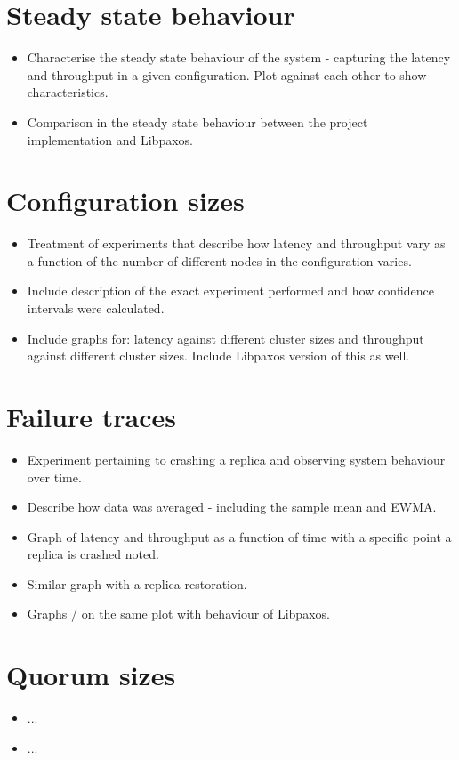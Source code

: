 \documentclass[12pt,twoside,notitlepage]{report}
\begin{document}
\section{Steady state behaviour}
\begin{itemize}
   \item Characterise the steady state behaviour of the system - capturing the latency and throughput in a given configuration. Plot against each other to show characteristics.
   \item Comparison in the steady state behaviour between the project implementation and Libpaxos.
\end{itemize}

\section{Configuration sizes}
\begin{itemize}
   \item Treatment of experiments that describe how latency and throughput vary as a function of the number of different nodes in the configuration varies.
      \item Include description of the exact experiment performed and how confidence intervals were calculated.
   \item Include graphs for: latency against different cluster sizes and throughput against different cluster sizes. Include Libpaxos version of this as well.
\end{itemize}

\section{Failure traces}
\begin{itemize}
  \item Experiment pertaining to crashing a replica and observing system behaviour over time.
  \item Describe how data was averaged - including the sample mean and EWMA.
  \item Graph of latency and throughput as a function of time with a specific point a replica is crashed noted.
  \item Similar graph with a replica restoration.
  \item Graphs / on the same plot with behaviour of Libpaxos.
\end{itemize}

\section{Quorum sizes}
\begin{itemize}
  \item ...
  \item ...
\end{itemize}
\end{document}
